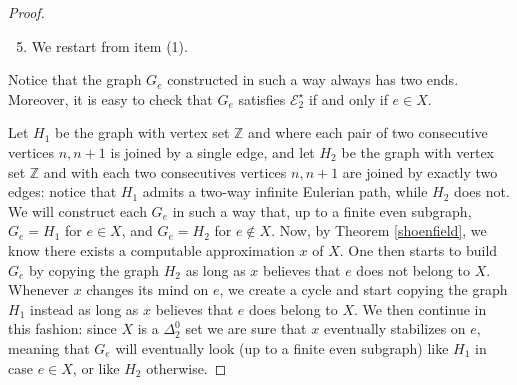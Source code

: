 \documentclass[10pt,A4]{amsart}
\theoremstyle{definition}
\theoremstyle{definition}
\newcommand{\eulertwo}{\mathscr{E} _{2}}
\newcommand{\Z}{\mathbb{Z}}
\begin{document}
\begin{proof}
\begin{tcolorbox}
\begin{center}
        \end{center}
    \end{tcolorbox}
    \begin{enumerate}
    \setcounter{enumi}{4}
        \item We restart from item (1).
    \end{enumerate}
    
            
    
    Notice that the graph $G_e$ constructed in such a way always has two ends. Moreover, it is easy to check that $G_e$ satisfies $\eulertwo^{\star}$ if and only if $e \in X$. 
    
     
     Let $H_1$ be the graph with vertex set $\Z$ and where each pair of two consecutive vertices $n, n+1$ is joined by a single edge, and let $H_2$ be the graph with vertex set $\Z$ and with each two consecutives vertices $n, n+1$ are joined by exactly two edges: notice that $H_1$ admits a two-way infinite Eulerian path, while $H_2$ does not. We will construct each $G_e$ in such a way that, up to a finite even subgraph, $G_e=H_1$ for $e\in X$, and $G_e=H_2$ for $e\not\in X$. Now, by Theorem \ref{shoenfield}, we know there exists a computable approximation $x$ of $X$. One then starts to build $G_e$ by copying the graph $H_2$ as long as $x$ believes that $e$ does not belong to $X$. Whenever $x$ changes its mind on $e$, we create a cycle and start copying the graph $H_1$ instead as long as $x$ believes that $e$ does belong to $X$. We then continue in this fashion: since $X$ is a $\Delta_2^0$ set we are sure that $x$ eventually stabilizes on $e$, meaning that $G_e$ will eventually look (up to a finite even subgraph) like $H_1$ in case $e \in X$, or like $H_2$ otherwise.
    \end{proof}
\end{document}
